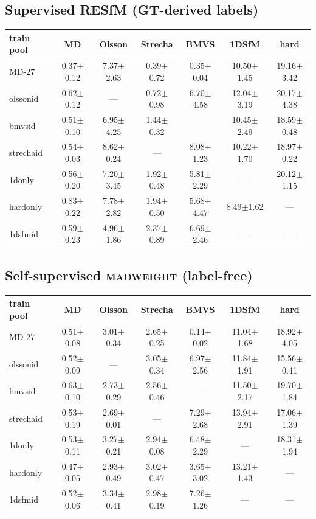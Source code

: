 \documentclass[11pt]{article}
\begin{document}
\subsection*{Supervised RESfM (GT-derived labels)}
\begin{center}\small\begin{tabular}{lcccccc}
\toprule
train pool & MD & Olsson & Strecha & BMVS & 1DSfM & hard\\
\midrule
MD-27 & 0.37$\pm$0.12 & 7.37$\pm$2.63 & 0.39$\pm$0.72 & 0.35$\pm$0.04 & 10.50$\pm$1.45 & 19.16$\pm$3.42\\
olssonid & 0.62$\pm$0.12 & --- & 0.72$\pm$0.98 & 6.70$\pm$4.58 & 12.04$\pm$3.19 & 20.17$\pm$4.38\\
bmvsid & 0.51$\pm$0.10 & 6.95$\pm$4.25 & 1.44$\pm$0.32 & --- & 10.45$\pm$2.49 & 18.59$\pm$0.48\\
strechaid & 0.54$\pm$0.03 & 8.62$\pm$0.24 & --- & 8.08$\pm$1.23 & 10.22$\pm$1.70 & 18.97$\pm$0.22\\
1donly & 0.56$\pm$0.20 & 7.20$\pm$3.45 & 1.92$\pm$0.48 & 5.81$\pm$2.29 & --- & 20.12$\pm$1.15\\
hardonly & 0.83$\pm$0.22 & 7.78$\pm$2.82 & 1.94$\pm$0.50 & 5.68$\pm$4.47 & 8.49$\pm$1.62 & ---\\
1dsfmid & 0.59$\pm$0.23 & 4.96$\pm$1.86 & 2.37$\pm$0.89 & 6.69$\pm$2.46 & --- & ---\\
\bottomrule\end{tabular}\end{center}
\subsection*{Self-supervised \textsc{madweight} (label-free)}
\begin{center}\small\begin{tabular}{lcccccc}
\toprule
train pool & MD & Olsson & Strecha & BMVS & 1DSfM & hard\\
\midrule
MD-27 & 0.51$\pm$0.08 & 3.01$\pm$0.34 & 2.65$\pm$0.25 & 0.14$\pm$0.02 & 11.04$\pm$1.68 & 18.92$\pm$4.05\\
olssonid & 0.52$\pm$0.09 & --- & 3.05$\pm$0.34 & 6.97$\pm$2.56 & 11.84$\pm$1.91 & 15.56$\pm$0.41\\
bmvsid & 0.63$\pm$0.10 & 2.73$\pm$0.29 & 2.56$\pm$0.46 & --- & 11.50$\pm$2.17 & 19.70$\pm$1.84\\
strechaid & 0.53$\pm$0.19 & 2.69$\pm$0.01 & --- & 7.29$\pm$2.68 & 13.94$\pm$2.91 & 17.06$\pm$1.39\\
1donly & 0.53$\pm$0.11 & 3.27$\pm$0.21 & 2.94$\pm$0.08 & 6.48$\pm$2.29 & --- & 18.31$\pm$1.94\\
hardonly & 0.47$\pm$0.05 & 2.93$\pm$0.49 & 3.02$\pm$0.47 & 3.65$\pm$3.02 & 13.21$\pm$1.43 & ---\\
1dsfmid & 0.52$\pm$0.06 & 3.34$\pm$0.41 & 2.98$\pm$0.19 & 7.26$\pm$1.26 & --- & ---\\
\bottomrule\end{tabular}\end{center}
\end{document}
